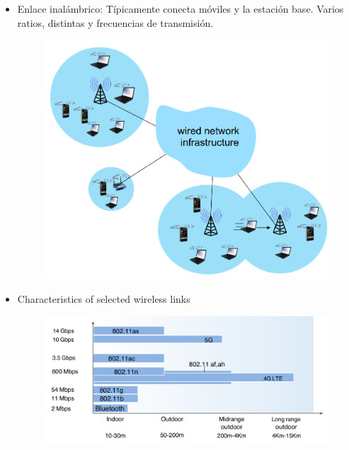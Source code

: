 \documentclass[12pt, twoside, openright]{report} %
\begin{document}
\begin{itemize}
\begin{itemize}
		      \item Enlace inalámbrico: Típicamente conecta móviles y la estación base.
		            Varios ratios, distintas y frecuencias de transmisión.
		            \begin{figure}[H]
			            {\includegraphics[scale=.25]{Untitled 59.png}}
		            \end{figure}
		      \item Characteristics of selected wireless links
		            \begin{figure}[H]
			            {\includegraphics[scale=.25]{Untitled 60.png}}
		            \end{figure}
	      \end{itemize}


\end{itemize}
\end{document}
